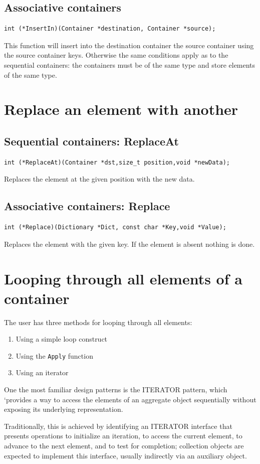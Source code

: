\documentclass[12pt,a4paper]{memoir} %
\begin{document}
\subsection{Associative containers}
\begin{verbatim}
int (*InsertIn)(Container *destination, Container *source);
\end{verbatim}
This function will insert into the destination container the source container using the source container keys. Otherwise the same conditions apply as to the sequential containers: the containers must be of the same type and store elements of the same type.
\section{Replace an element with another}
\subsection{Sequential containers: ReplaceAt}
\begin{verbatim}
int (*ReplaceAt)(Container *dst,size_t position,void *newData);
\end{verbatim}
Replaces the element at the given position with the new data. 
\subsection{Associative containers: Replace}
\begin{verbatim}
int (*Replace)(Dictionary *Dict, const char *Key,void *Value);
\end{verbatim}
Replaces the element with the given key. If the element is absent nothing is done.
\section{Looping through all elements of a container}
The user has  three methods for looping through all elements:
\begin{enumerate}
\item Using a simple loop construct
\item Using the \verb,Apply, function
\item Using an iterator
\end{enumerate}
One the most familiar design patterns  is the ITERATOR pattern, which ‘provides a way to access the elements of an aggregate object sequentially without exposing its underlying representation. 

Traditionally, this is achieved by identifying an ITERATOR interface that presents operations to initialize an iteration, to access the current element, to advance to the next element, and to test for completion; collection objects are expected to implement this interface, usually indirectly via an auxiliary object. 
\end{document}
